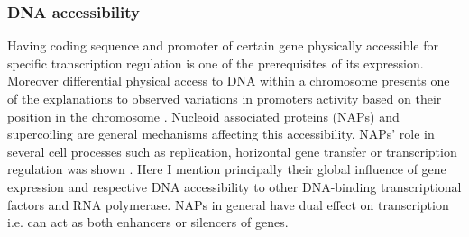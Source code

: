 

\subsubsection{DNA accessibility}
Having coding sequence and promoter of certain gene physically accessible for specific transcription regulation is one of the prerequisites of its expression.
Moreover differential physical access to DNA within a chromosome presents one of the explanations to observed variations in promoters activity based on their position in the chromosome \cite{bryant2014chromosome}.
Nucleoid associated proteins (NAPs) and supercoiling are general mechanisms affecting this accessibility.
NAPs' role in several cell processes such as replication, horizontal gene transfer or transcription regulation was shown \cite{dixon1984protein, kayoko1992histone, aznar2013hha}.
Here I mention principally their global influence of gene expression and respective DNA accessibility to other DNA-binding transcriptional factors and RNA polymerase.
NAPs in general have dual effect on transcription i.e. can act as both enhancers or silencers of genes.

